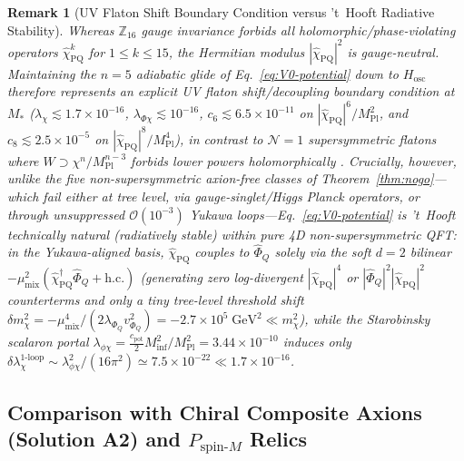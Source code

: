 \documentclass[11pt,a4paper]{article}
\newtheorem*{remark}{Remark}
\begin{document}
\begin{remark}[UV Flaton Shift Boundary Condition versus 't~Hooft Radiative Stability]
Whereas $\mathbb{Z}_{16}$ gauge invariance forbids all holomorphic/phase-violating operators $\hat{\chi}_{\mathrm{PQ}}^k$ for $1 \le k \le 15$, the Hermitian modulus $|\hat{\chi}_{\mathrm{PQ}}|^2$ is gauge-neutral. Maintaining the $n = 5$ adiabatic glide of Eq.~\eqref{eq:V0-potential} down to $H_{\mathrm{osc}}$ therefore represents an explicit UV flaton shift/decoupling boundary condition at $M_*$ ($\lambda_\chi \lesssim 1.7\times 10^{-16}$, $\lambda_{\Phi\chi} \lesssim 10^{-16}$, $c_6 \lesssim 6.5\times 10^{-11}$ on $|\hat{\chi}_{\mathrm{PQ}}|^6/M_{\mathrm{Pl}}^2$, and $c_8 \lesssim 2.5\times 10^{-5}$ on $|\hat{\chi}_{\mathrm{PQ}}|^8/M_{\mathrm{Pl}}^4$), in contrast to $\mathcal{N}=1$ supersymmetric flatons where $W \supset \chi^n/M_{\mathrm{Pl}}^{n-3}$ forbids lower powers holomorphically \cite{HarigayaIbeKawasakiYanagida2015}. Crucially, however, unlike the five non-supersymmetric axion-free classes of Theorem~\ref{thm:nogo}---which fail either at tree level, via gauge-singlet/Higgs Planck operators, or through unsuppressed $\mathcal{O}(10^{-3})$ Yukawa loops---Eq.~\eqref{eq:V0-potential} is \emph{'t~Hooft technically natural (radiatively stable)} within pure 4D non-supersymmetric QFT: in the Yukawa-aligned basis, $\hat{\chi}_{\mathrm{PQ}}$ couples to $\hat{\Phi}_Q$ solely via the soft $d=2$ bilinear $-\mu_{\mathrm{mix}}^2(\hat{\chi}_{\mathrm{PQ}}^\dagger\hat{\Phi}_Q + \mathrm{h.c.})$ (generating zero log-divergent $|\hat{\chi}_{\mathrm{PQ}}|^4$ or $|\hat{\Phi}_Q|^2|\hat{\chi}_{\mathrm{PQ}}|^2$ counterterms and only a tiny tree-level threshold shift $\delta m_\chi^2 = -\mu_{\mathrm{mix}}^4/(2\lambda_{\Phi_Q}v_{\Phi_Q}^2) = -2.7\times 10^5\;\mathrm{GeV}^2 \ll m_\chi^2$), while the Starobinsky scalaron portal $\lambda_{\phi\chi} = \frac{c_{\mathrm{pot}}}{2}M_{\mathrm{inf}}^2/M_{\mathrm{Pl}}^2 = 3.44\times 10^{-10}$ induces only $\delta\lambda_\chi^{\text{1-loop}} \sim \lambda_{\phi\chi}^2/(16\pi^2) \simeq 7.5\times 10^{-22} \ll 1.7\times 10^{-16}$.
\end{remark}

\subsection{Comparison with Chiral Composite Axions (\textbf{Solution A2}) and \texorpdfstring{$P_{\mathrm{spin}\text{-}M}$}{Pspin-M} Relics}
\label{subsec:composite-axion}
\end{document}
